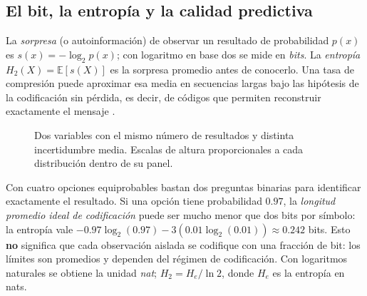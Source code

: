 \subsection{El bit, la entropía y la calidad predictiva}\label{s01:cap:informacion}

\begin{idea}
La \emph{sorpresa} (o autoinformación) de observar un resultado de probabilidad
$p(x)$ es $s(x)=-\log_2p(x)$; con logaritmo en base dos se mide en \emph{bits}.
La \emph{entropía} $H_2(X)=\mathbb E[s(X)]$ es la sorpresa promedio antes
 de conocerlo. Una tasa de compresión puede aproximar esa media en secuencias
largas bajo las hipótesis de la codificación sin pérdida, es decir, de códigos que
permiten reconstruir exactamente el mensaje
\citep{shannon1948,cover2006,huffman1952}.
\end{idea}

\begin{figure}[htbp]\centering
{}
\caption{Dos variables con el mismo número de resultados y distinta incertidumbre media. Escalas de altura proporcionales a cada distribución dentro de su panel.}\label{fig:c1:bit-distribuciones}
\end{figure}

Con cuatro opciones equiprobables bastan dos preguntas binarias para identificar
exactamente el resultado. Si una opción tiene probabilidad $0.97$, la
\emph{longitud promedio ideal de codificación} puede ser mucho menor que dos
bits por símbolo: la entropía vale
$-0.97\log_2(0.97)-3(0.01\log_2(0.01))\approx0.242$ bits.
Esto \textbf{no} significa que cada observación aislada se codifique con una
fracción de bit: los límites son promedios y dependen del régimen de
codificación. Con logaritmos naturales se obtiene la unidad \emph{nat};
$H_2=H_e/\ln2$, donde $H_e$ es la entropía en nats.

